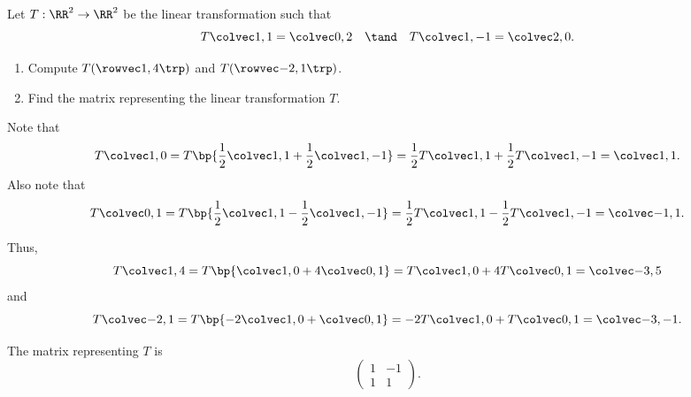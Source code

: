 \begin{problem}
    Let $T : \RR^2 \to \RR^2$ be the linear transformation such that \[T\cvecii11 = \cvecii02 \quad \tand \quad T\cvecii1{-1} = \cvecii20.\]

    \begin{enumerate}
        \item Compute $T(\cveciix14)$ and $T(\cveciix{-2}{1})$.
        \item Find the matrix representing the linear transformation $T$.
    \end{enumerate}
\end{problem}
\begin{solution}
    \begin{ppart}
        Note that \[T\cvecii10 = T\bp{\frac12 \cvecii11 + \frac12 \cvecii1{-1}} = \frac12 T\cvecii11 + \frac12 T\cvecii1{-1} = \cvecii11.\] Also note that \[T\cvecii01 = T\bp{\frac12 \cvecii11 - \frac12 \cvecii1{-1}} = \frac12 T\cvecii11 - \frac12 T\cvecii1{-1} = \cvecii{-1}{1}.\]

        Thus, \[T\cvecii14 = T\bp{\cvecii10 + 4\cvecii01} = T\cvecii10 + 4T\cvecii01 = \cvecii{-3}{5}\] and \[T\cvecii{-2}1 = T\bp{-2\cvecii10 + \cvecii01} = -2 T\cvecii10 + T\cvecii01 = \cvecii{-3}{-1}.\]
    \end{ppart}
    \begin{ppart}
        The matrix representing $T$ is \[\begin{pmatrix}1 & -1 \\ 1 & 1\end{pmatrix}.\]
    \end{ppart}
\end{solution}

